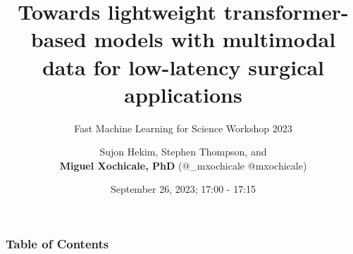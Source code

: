 \documentclass[xcolor={dvipsnames},aspectratio=169,10pt]{beamer}
\title{  
Towards lightweight transformer-based models with multimodal data for low-latency surgical applications
}
\subtitle{Fast Machine Learning for Science Workshop 2023}
\author{
Sujon Hekim, Stephen Thompson, and \\
{\bf Miguel Xochicale, PhD} (\faTwitter @\_mxochicale  \faGithub @mxochicale)
}
\date{
September 26, 2023; 17:00 - 17:15
}
\institute{
	Advanced Research Computing Centre and WEISS \\
	University College London
	}
\begin{document}
\maketitle

\begin{frame}
\frametitle{Table of Contents}
    \tableofcontents
\end{frame}







\maketitle
\end{document}
